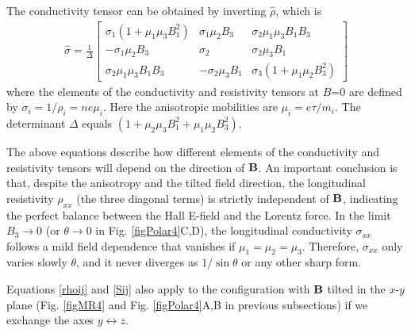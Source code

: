 The conductivity tensor can be obtained by inverting $\hat\rho$, which is 
\begin{eqnarray}
\hat{\sigma} = 
						\frac{1}{\Delta}\left[  	\begin{array}{ccc}
								\sigma_1(1+\mu_1\mu_3 B_1^2)  &  \sigma_1\mu_2B_3   &   \sigma_2\mu_1\mu_3 B_1B_3 \\
								 -\sigma_1\mu_2B_3									&   \sigma_2   									&   \sigma_2\mu_3B_1   \\
								\sigma_2\mu_1\mu_3 B_1B_3     &    -\sigma_2\mu_3B_1      &   \sigma_3(1+\mu_1\mu_2B_3^2)
								\end{array}
								\right]
				\label{Sij}
				\end{eqnarray}
where the elements of the conductivity and resistivity tensors at $B$=0 are defined by $\sigma_i = 1/\rho_i = ne\mu_i $. Here the anisotropic
mobilities are $\mu_i = e\tau/m_i$. The determinant $\Delta$ equals $(1+\mu_2\mu_3 B_1^2+ \mu_1\mu_2 B_3^2)$.

The above equations describe how different elements of the conductivity and resistivity tensors will depend on the direction of $\bf B$. An important conclusion is that, despite the anisotropy and the tilted field direction, the longitudinal resistivity 
$\rho_{xx}$ (the three diagonal terms) is strictly independent of $\bf B$, indicating the perfect balance between the Hall E-field and the Lorentz force. In the limit $B_3\to 0$ (or $\theta\to 0$ in Fig. \ref{figPolar4}C,D), the longitudinal conductivity $\sigma_{xx}$ follows a mild field dependence that vanishes if $\mu_1 = \mu_2 = \mu_3$. Therefore, $\sigma_{xx}$ only varies slowly $\theta$, and it never diverges as $1/\sin\theta$ or any other sharp form.

Equations \ref{rhoij} and \ref{Sij} also apply to the configuration with $\bf B$ tilted in the $x$-$y$ plane (Fig. \ref{figMR4} and Fig. \ref{figPolar4}A,B in previous subsections) if we exchange the axes $y\leftrightarrow z$.



